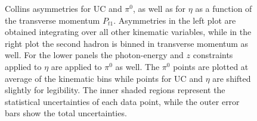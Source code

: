 \begin{figure}[H]
  \centering
\caption[Collins asymmetries for UC and $\pi^0$, as well as for $\eta$ as a function of $P_{t1}$]{Collins asymmetries for UC and $\pi^0$, as well as for $\eta$ as a function of the transverse momentum $P_{t1}$. 
Asymmetries in the left plot are obtained integrating over all other kinematic variables, while in the right plot the second hadron is binned in transverse momentum as well.
For the lower panels the photon-energy and $z$ constraints applied to $\eta$ are applied to $\pi^0$ as well. 
The $\pi^0$ points are plotted at average of the kinematic bins while points for UC and $\eta$ are shifted slightly for legibility. 
The inner shaded regions represent the statistical uncertainties of each data point, while the outer error bars show the total uncertainties.}
\label{fig:finalasymmetry1}
\end{figure}

